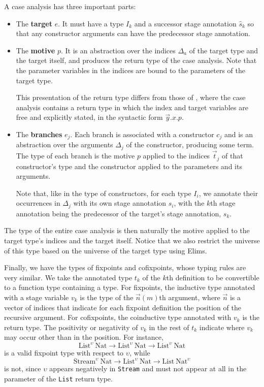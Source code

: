 \documentclass[sigplan,10pt,anonymous,review,nonacm]{acmart}
\begin{document}
A case analysis has three important parts:
\begin{itemize}
    \item The \textbf{target} $e$. It must have a \coinductive type $I_k$ and a successor stage annotation $\hat{s}_k$ so that any constructor arguments can have the predecessor stage annotation.
    \item The \textbf{motive} $p$. It is an abstraction over the indices $\Delta_a$ of the target type and the target itself, and produces the return type of the case analysis. Note that the parameter variables in the indices are bound to the parameters of the target type.
    
    This presentation of the return type differs from those of \cite{cic-hat-bar, cic-hat-l, cc-hat-omega}, where the case analysis contains a return type in which the index and target variables are free and explicitly stated, in the syntactic form $\vec{y}.x.p$.
    \item The \textbf{branches} $e_j$. Each branch is associated with a constructor $c_j$ and is an abstraction over the arguments $\Delta_j$ of the constructor, producing some term. The type of each branch is the motive $p$ applied to the indices $\vec{t}_j$ of that constructor's type and the constructor applied to the parameters and its arguments.
    
    Note that, like in the type of constructors, for each \coinductive type $I_i$, we annotate their occurrences in $\Delta_j$ with its own stage annotation $s_i$, with the $k$th stage annotation being the predecessor of the target's stage annotation, $s_k$.
\end{itemize}
The type of the entire case analysis is then naturally the motive applied to the target type's indices and the target itself. Notice that we also restrict the universe of this type based on the universe of the target type using Elims.

Finally, we have the types of fixpoints and cofixpoints, whose typing rules are very similar. We take the annotated type $t_k$ of the $k$th \cofixpoint definition to be convertible to a function type containing a \coinductive type. For fixpoints, the inductive type annotated with a stage variable $v_k$ is the type of the $\vec{n}(m)$th argument, where $\vec{n}$ is a vector of indices that indicate for each fixpoint definition the position of the recursive argument. For cofixpoints, the coinductive type annotated with $v_k$ is the return type. The positivity or negativity of $v_k$ in the rest of $t_k$ indicate where $v_k$ may occur other than in the \corecursive position. For instance,
\begin{equation*}
\text{List}^\upsilon\ \text{Nat} \to \text{List}^\upsilon\ \text{Nat} \to \text{List}^\upsilon\ \text{Nat}
\end{equation*}
is a valid fixpoint type with respect to $\upsilon$, while
\begin{equation*}
\text{Stream}^\upsilon\ \text{Nat} \to \text{List}^\upsilon\ \text{Nat} \to \text{List}\ \text{Nat}^\upsilon
\end{equation*}
is not, since $\upsilon$ appears negatively in \texttt{Stream} and must not appear at all in the parameter of the \texttt{List} return type.
\end{document}
